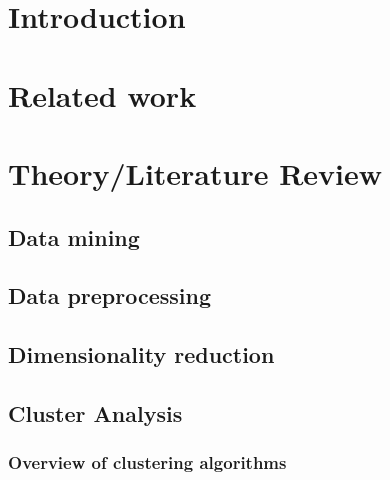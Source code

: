 \section{Introduction}
\label{section:Introduction}




\section{Related work}
\label{section:RelatedWork}




\section{Theory/Literature Review}
\label{section:Theory}


  \subsection{Data mining}
  \label{section:TheoryDataMining}
  
    
  \subsection{Data preprocessing}
  \label{section:TheoryDataPreprocessing}
  

  \subsection{Dimensionality reduction}
  \label{section:TheoryDimensionalityReduction}
  
  
  \subsection{Cluster Analysis}
  \label{section:TheoryClusterAnalysis}
  

    \subsubsection{Overview of clustering algorithms}
    \label{section:TheoryOverviewClusteringAlgorithms}
    

